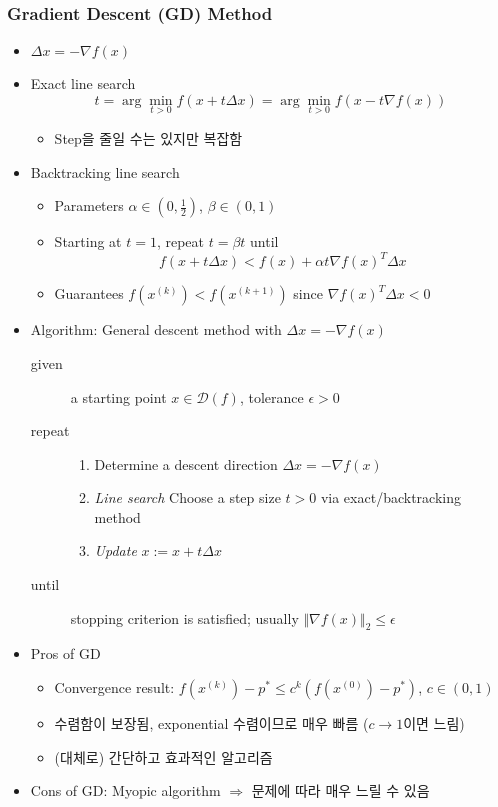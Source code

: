\subsubsection*{Gradient Descent (GD) Method}
\begin{itemize}
    \item $\Delta x = -\nabla f(x)$
    \item Exact line search
        $$t = \arg\min_{t>0}f(x+t\Delta x) = \arg\min_{t>0}f(x-t\nabla f(x))$$
    \begin{itemize}
        \item Step을 줄일 수는 있지만 복잡함
    \end{itemize}
    \item Backtracking line search
    \begin{itemize}
        \item Parameters $\alpha\in\left(0,\frac{1}{2}\right)$, $\beta\in(0,1)$
        \item Starting at $t=1$, repeat $t=\beta t$ until
            $$ f(x+t\Delta x) < f(x)+\alpha t\nabla f(x)^T\Delta x $$
        \item Guarantees $f(x^{(k)})<f(x^{(k+1)})$ since $\nabla f(x)^T\Delta x<0$
    \end{itemize}
    \item Algorithm: General descent method with $\Delta x = -\nabla f(x)$
    \begin{description}
        \item[given] a starting point $x\in\mathcal{D}(f)$, tolerance $\epsilon>0$
        \item[repeat] \phantom{}
        \begin{enumerate}
            \item Determine a descent direction $\Delta x=-\nabla f(x)$
            \item \textit{Line search} Choose a step size $t>0$ via exact/backtracking method
            \item \textit{Update} $x:=x+t\Delta x$
        \end{enumerate}
        \item[until] stopping criterion is satisfied; usually $\Vert\nabla f(x)\Vert_2\leq\epsilon$
    \end{description}
    \item Pros of GD
    \begin{itemize}
        \item Convergence result: $f(x^{(k)})-p^\ast\leq c^k\left(f(x^{(0)})-p^\ast\right)$, $c\in(0,1)$
        \item 수렴함이 보장됨, exponential 수렴이므로 매우 빠름 ($c\rightarrow 1$이면 느림)
        \item (대체로) 간단하고 효과적인 알고리즘
    \end{itemize}
    \item Cons of GD: Myopic algorithm $\Rightarrow$ 문제에 따라 매우 느릴 수 있음
\end{itemize}

